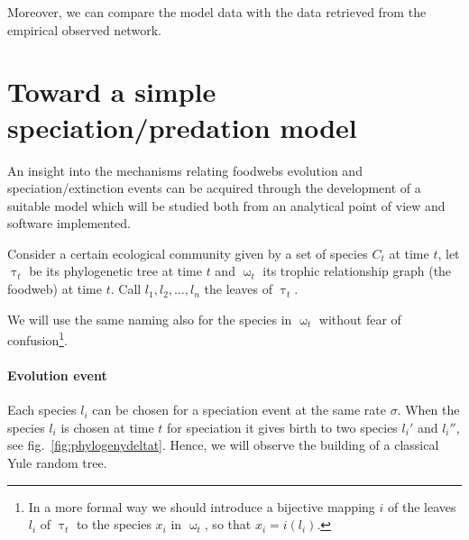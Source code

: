\documentclass[12pt,a4paper]{report}
\begin{document}
Moreover, we can compare the model data with the data retrieved from the empirical observed network.


\section{Toward a simple speciation/predation model}

An insight into the mechanisms relating foodwebs evolution and speciation/extinction events can be acquired through the development of a suitable model which will be studied both from an analytical point of view and software  implemented.

Consider a certain ecological community given by a set of species $C_t$ at time $t$, let $\uptau_t$ be its phylogenetic tree at time $t$ and $\upomega_t$ its trophic relationship graph (the foodweb) at time $t$. Call $l_1, l_2, \dots , l_n$ the leaves of $\uptau_t$.

We will use the same naming also for the species in $\upomega_t$ without fear of confusion\footnote{In a more formal way we should introduce a bijective mapping $i$ of the leaves $l_i$ of $\uptau_t$ to the species $x_i$ in $\upomega_t$, so that $x_i=i(l_i)$.}.

\paragraph{Evolution event}

Each species $l_i$ can be chosen for a speciation event at the same rate $\sigma$. When the species $l_i$ is chosen at time $t$ for speciation it gives birth to two species $l_i'$ and $l_i''$, see fig.~\ref{fig:phylogenydeltat}. Hence, we will observe the building of a classical Yule random tree.
\end{document}
